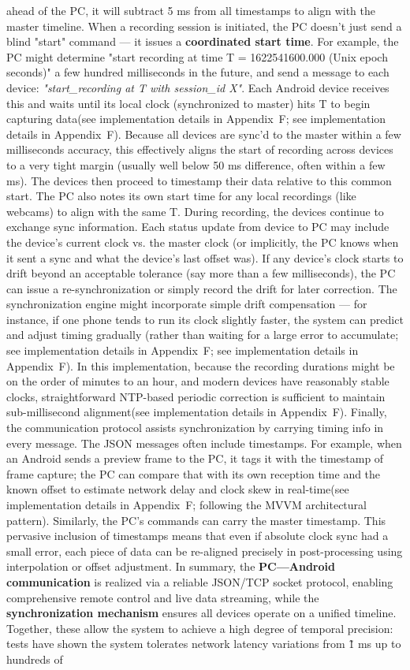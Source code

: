 ahead of the PC, it will subtract 5 ms from all timestamps to align with the master timeline. When a recording session is initiated, the PC doesn't just send a blind "start" command --- it issues a \textbf{coordinated start time}. For example, the PC might determine "start recording at time T = 1622541600.000 (Unix epoch seconds)" a few hundred milliseconds in the future, and send a message to each device: \textit{"start_recording at T with session_id X"}. Each Android device receives this and waits until its local clock (synchronized to master) hits T to begin capturing data(see implementation details in Appendix~F; see implementation details in Appendix~F). Because all devices are sync'd to the master within a few milliseconds accuracy, this effectively aligns the start of recording across devices to a very tight margin (usually well below 50 ms difference, often within a few ms). The devices then proceed to timestamp their data relative to this common start. The PC also notes its own start time for any local recordings (like webcams) to align with the same T. During recording, the devices continue to exchange sync information. Each status update from device to PC may include the device's current clock vs. the master clock (or implicitly, the PC knows when it sent a sync and what the device's last offset was). If any device's clock starts to drift beyond an acceptable tolerance (say more than a few milliseconds), the PC can issue a re-synchronization or simply record the drift for later correction. The synchronization engine might incorporate simple drift compensation --- for instance, if one phone tends to run its clock slightly faster, the system can predict and adjust timing gradually (rather than waiting for a large error to accumulate; see implementation details in Appendix~F; see implementation details in Appendix~F). In this implementation, because the recording durations might be on the order of minutes to an hour, and modern devices have reasonably stable clocks, straightforward NTP-based periodic correction is sufficient to maintain sub-millisecond alignment(see implementation details in Appendix~F). Finally, the communication protocol assists synchronization by carrying timing info in every message. The JSON messages often include timestamps. For example, when an Android sends a preview frame to the PC, it tags it with the timestamp of frame capture; the PC can compare that with its own reception time and the known offset to estimate network delay and clock skew in real-time(see implementation details in Appendix~F; following the MVVM architectural pattern). Similarly, the PC's commands can carry the master timestamp. This pervasive inclusion of timestamps means that even if absolute clock sync had a small error, each piece of data can be re-aligned precisely in post-processing using interpolation or offset adjustment. In summary, the \textbf{PC---Android communication} is realized via a reliable JSON/TCP socket protocol, enabling comprehensive remote control and live data streaming, while the \textbf{synchronization mechanism} ensures all devices operate on a unified timeline. Together, these allow the system to achieve a high degree of temporal precision: tests have shown the system tolerates network latency variations from \~1 ms up to hundreds of 